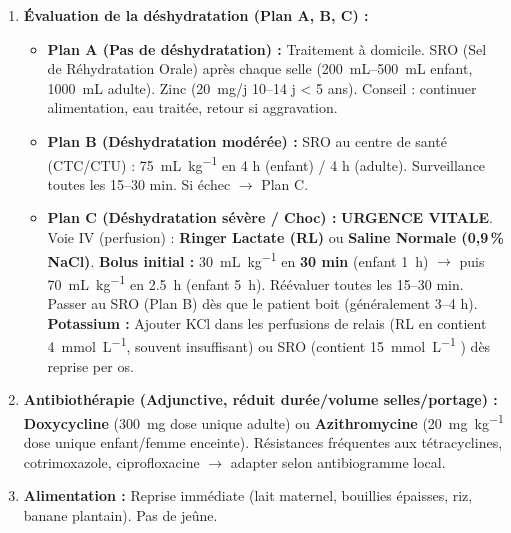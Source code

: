 \documentclass[11pt]{article}
\begin{document}
\begin{propriete}
\begin{enumerate}
    \item \textbf{Évaluation de la déshydratation (Plan A, B, C) :}
    \begin{itemize}
        \item \textbf{Plan A (Pas de déshydratation) :} Traitement à domicile. SRO (Sel de Réhydratation Orale) après chaque selle (\SI{200}{\milli\liter}--\SI{500}{\milli\liter} enfant, \SI{1000}{\milli\liter} adulte). Zinc (\SI{20}{\milli\gram}/j 10--14 j < 5 ans). Conseil : continuer alimentation, eau traitée, retour si aggravation.
        \item \textbf{Plan B (Déshydratation modérée) :} SRO au centre de santé (CTC/CTU) : \SI{75}{\milli\liter\per\kilo\gram} en 4 h (enfant) / 4 h (adulte). Surveillance toutes les 15--30 min. Si échec $\to$ Plan C.
        \item \textbf{Plan C (Déshydratation sévère / Choc) :} \textbf{URGENCE VITALE}. Voie IV (perfusion) : \textbf{Ringer Lactate (RL)} ou \textbf{Saline Normale (0,9\,\% NaCl)}. \textbf{Bolus initial :} \SI{30}{\milli\liter\per\kilo\gram} en \textbf{30 min} (enfant \SI{1}{\hour}) $\to$ puis \SI{70}{\milli\liter\per\kilo\gram} en \SI{2.5}{\hour} (enfant \SI{5}{\hour}). Réévaluer toutes les 15--30 min. Passer au SRO (Plan B) dès que le patient boit (généralement 3--4 h). \textbf{Potassium :} Ajouter KCl dans les perfusions de relais (RL en contient \SI{4}{\milli\mole\per\liter}, souvent insuffisant) ou SRO (contient \SI{15}{\milli\mole\per\liter} ) dès reprise per os.
    \end{itemize}
    \item \textbf{Antibiothérapie (Adjunctive, réduit durée/volume selles/portage) :} \textbf{Doxycycline} (\SI{300}{\milli\gram} dose unique adulte) ou \textbf{Azithromycine} (\SI{20}{\milli\gram\per\kilo\gram} dose unique enfant/femme enceinte). Résistances fréquentes aux tétracyclines, cotrimoxazole, ciprofloxacine $\to$ adapter selon antibiogramme local.
    \item \textbf{Alimentation :} Reprise immédiate (lait maternel, bouillies épaisses, riz, banane plantain). Pas de jeûne.
\end{enumerate}
\end{propriete}
\end{document}
